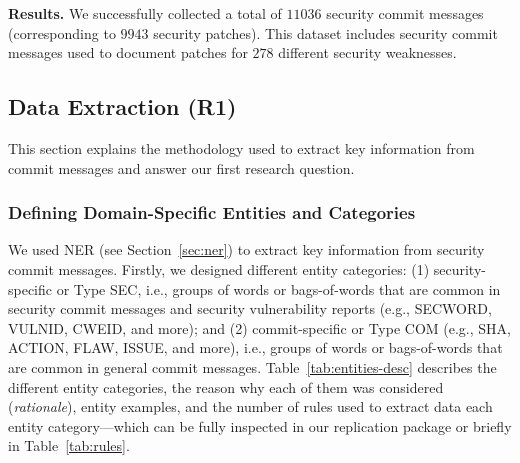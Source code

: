 \textbf{Results.} We successfully collected a total of $11036$ security commit messages (corresponding to $9943$ security patches). This dataset includes security commit messages used 
to document patches for $278$ different security weaknesses.


\subsection{Data Extraction (R1)}

This section explains the methodology used to extract key information from commit messages and answer our first research question. 

\subsubsection{Defining Domain-Specific Entities and Categories} 

We used NER (see Section~\ref{sec:ner}) to 
extract key information from security commit messages.
%
Firstly, we designed different entity categories: (1) security-specific or Type SEC, i.e., groups of words or bags-of-words that are common in security commit messages and security vulnerability reports (e.g., SECWORD, VULNID, CWEID, and more); and (2) commit-specific or Type COM (e.g., SHA, ACTION, FLAW, ISSUE, and more), i.e., groups of words or bags-of-words that are common in general commit messages. 
Table~\ref{tab:entities-desc} describes the different entity 
categories, the reason why each of them was considered (\textit{rationale}), entity examples, and the number of rules used to extract data each entity category---which can be fully inspected in our replication package or briefly in Table~\ref{tab:rules}. 

